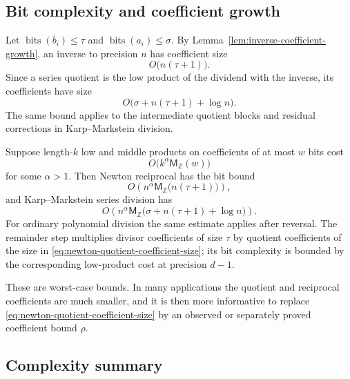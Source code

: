\documentclass[11pt]{book}
\theoremstyle{definition}
\newcommand{\ZZ}{\mathbb Z}
\newcommand{\bits}{\operatorname{bits}}
\newcommand{\MZ}{\mathsf M_{\ZZ}}
\begin{document}
\subsection{Bit complexity and coefficient growth}

Let $\bits(b_i)\leq\tau$ and $\bits(a_i)\leq\sigma$.  By
Lemma~\ref{lem:inverse-coefficient-growth}, an inverse to precision $n$ has
coefficient size
\[
 O\bigl(n(\tau+1)\bigr).
\]
Since a series quotient is the low product of the dividend with the inverse,
its coefficients have size
\begin{equation}\label{eq:newton-quotient-coefficient-size}
 O\bigl(\sigma+n(\tau+1)+\log n\bigr).
\end{equation}
The same bound applies to the intermediate quotient blocks and residual
corrections in Karp--Markstein division.

Suppose length-$k$ low and middle products on coefficients of at most $w$ bits
cost
\[
 O\bigl(k^\alpha\MZ(w)\bigr)
\]
for some $\alpha>1$.  Then Newton reciprocal has the bit bound
\[
 O\!\left(
 n^\alpha\MZ\bigl(n(\tau+1)\bigr)
 \right),
\]
and Karp--Markstein series division has
\begin{equation}\label{eq:km-bit-complexity}
 O\!\left(
 n^\alpha
 \MZ\bigl(\sigma+n(\tau+1)+\log n\bigr)
 \right).
\end{equation}
For ordinary polynomial division the same estimate applies after reversal.
The remainder step multiplies divisor coefficients of size $\tau$ by quotient
coefficients of the size in \eqref{eq:newton-quotient-coefficient-size}; its
bit complexity is bounded by the corresponding low-product cost at precision
$d-1$.

These are worst-case bounds.  In many applications the quotient and reciprocal
coefficients are much smaller, and it is then more informative to replace
\eqref{eq:newton-quotient-coefficient-size} by an observed or separately proved
coefficient bound $\rho$.

\subsection{Complexity summary}
\end{document}
